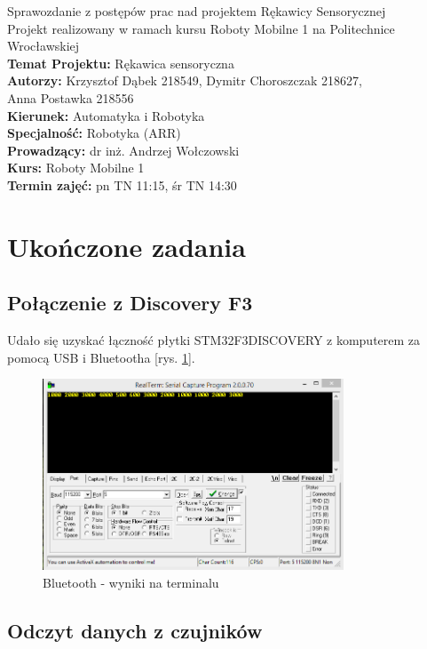 \documentclass[12pt,a4paper]{article}
\begin{document}
\LARGE\centering Sprawozdanie z postępów prac nad projektem Rękawicy Sensorycznej\\
\large\centering Projekt realizowany w ramach kursu Roboty Mobilne 1 na Politechnice Wrocławskiej\\
\vspace{5 mm}
\normalsize\flushleft\textbf{Temat Projektu:} Rękawica sensoryczna\\
\textbf{Autorzy:} Krzysztof Dąbek 218549, Dymitr Choroszczak 218627,\\Anna Postawka 218556\\
\textbf{Kierunek:} Automatyka i Robotyka\\
\textbf{Specjalność:} Robotyka (ARR)\\
\textbf{Prowadzący:} dr inż. Andrzej Wołczowski\\
\textbf{Kurs:} Roboty Mobilne 1\\
\textbf{Termin zajęć:} pn TN 11:15, śr TN 14:30\\
\vspace{5 mm}
\section{Ukończone zadania}
\subsection{Połączenie z Discovery F3}
Udało się uzyskać łączność płytki STM32F3DISCOVERY z komputerem za pomocą USB i Bluetootha [rys.  \ref{fig:bluetooth}].
\begin{figure}[h]
\centering
\includegraphics[width=0.8\textwidth]{./BluetoothWynikiNaTerminalu.PNG}
\caption{Bluetooth - wyniki na terminalu}
\label{fig:bluetooth}
\end{figure}
\subsection{Odczyt danych z czujników}
\end{document}
